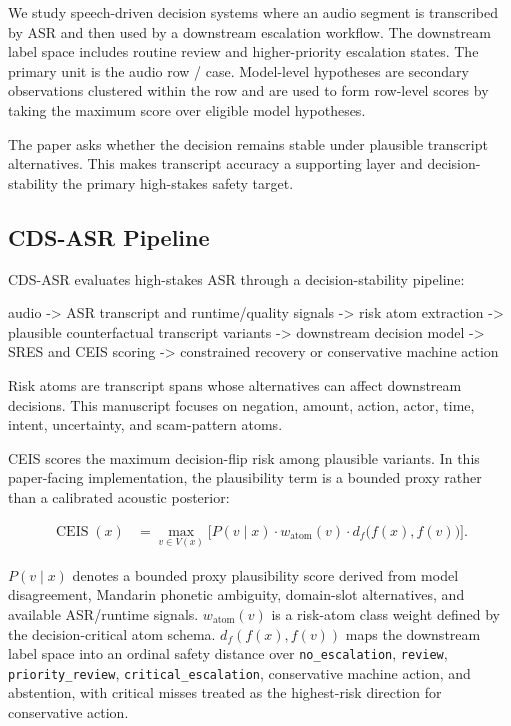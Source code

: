 \documentclass[
]{article}
\newenvironment{Shaded}{}{}
\newcommand{\NormalTok}[1]{#1}
\begin{document}
We study speech-driven decision systems where an audio segment is
transcribed by ASR and then used by a downstream escalation workflow.
The downstream label space includes routine review and higher-priority
escalation states. The primary unit is the audio row / case. Model-level
hypotheses are secondary observations clustered within the row and are
used to form row-level scores by taking the maximum score over eligible
model hypotheses.

The paper asks whether the decision remains stable under plausible
transcript alternatives. This makes transcript accuracy a supporting
layer and decision-stability the primary high-stakes safety target.

\hypertarget{cds-asr-pipeline}{%
\subsection{CDS-ASR Pipeline}\label{cds-asr-pipeline}}

CDS-ASR evaluates high-stakes ASR through a decision-stability pipeline:

\begin{Shaded}
\begin{Highlighting}[]
\NormalTok{audio}
\NormalTok{{-}\textgreater{} ASR transcript and runtime/quality signals}
\NormalTok{{-}\textgreater{} risk atom extraction}
\NormalTok{{-}\textgreater{} plausible counterfactual transcript variants}
\NormalTok{{-}\textgreater{} downstream decision model}
\NormalTok{{-}\textgreater{} SRES and CEIS scoring}
\NormalTok{{-}\textgreater{} constrained recovery or conservative machine action}
\end{Highlighting}
\end{Shaded}

Risk atoms are transcript spans whose alternatives can affect downstream
decisions. This manuscript focuses on negation, amount, action, actor,
time, intent, uncertainty, and scam-pattern atoms.

CEIS scores the maximum decision-flip risk among plausible variants. In
this paper-facing implementation, the plausibility term is a bounded
proxy rather than a calibrated acoustic posterior:

\[
\begin{aligned}
\operatorname{CEIS}(x)
&=
\max_{v \in V(x)}
\Big[
  P(v \mid x)
  \cdot w_{\mathrm{atom}}(v)
  \cdot d_f\!\big(f(x), f(v)\big)
\Big].
\end{aligned}
\]

\(P(v \mid x)\) denotes a bounded proxy
plausibility score derived from model disagreement, Mandarin phonetic
ambiguity, domain-slot alternatives, and available ASR/runtime signals.
\(w_{\mathrm{atom}}(v)\) is a risk-atom class weight defined by the
decision-critical atom schema. \(d_f(f(x), f(v))\) maps the
downstream label space into an ordinal safety distance over
\texttt{no\_escalation}, \texttt{review}, \texttt{priority\_review},
\texttt{critical\_escalation}, conservative machine action, and
abstention, with critical misses treated as the highest-risk direction
for conservative action.
\end{document}
